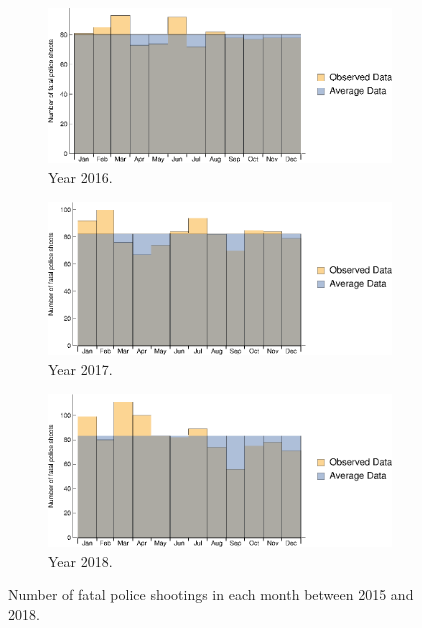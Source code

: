 \documentclass[conf]{new-aiaa}
\begin{document}
\begin{figure}[!htbp]
\begin{subfigure}{.49\textwidth}
  \centering
  \includegraphics[width=\linewidth]{q4/q4-month-2016.eps}  
  \caption{Year 2016.}
  \label{fig:q4-month-2016}
\end{subfigure}
\begin{subfigure}{.49\textwidth}
  \centering
  \includegraphics[width=\linewidth]{q4/q4-month-2017.eps}  
  \caption{Year 2017.}
  \label{fig:q4-month-2017}
\end{subfigure}
\begin{subfigure}{.49\textwidth}
  \centering
  \includegraphics[width=\linewidth]{q4/q4-month-2018.eps}  
  \caption{Year 2018.}
  \label{fig:q4-month-2018}
\end{subfigure}
\caption{Number of fatal police shootings in each month between 2015 and 2018.}
\label{fig:q4-month}
\end{figure}
\end{document}
